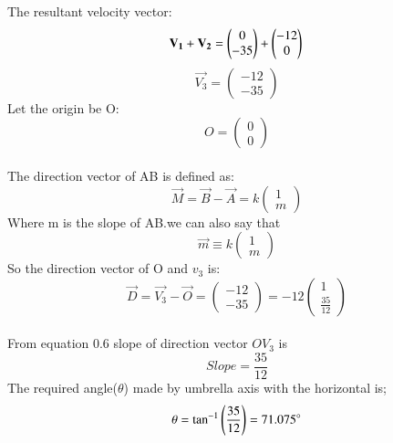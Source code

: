 \documentclass[journal]{IEEEtran}
\begin{document}
The resultant velocity vector:\\
\begin{equation}
\vec{V_{1}}+\vec{V_{2}}=\begin{pmatrix}
    0\\
    -35
\end{pmatrix}
+
\begin{pmatrix}
    -12\\
    0
\end{pmatrix}\\
\end{equation}
\begin{equation}
    \vec{V_{3}}=\begin{pmatrix}
        -12\\
        -35
    \end{pmatrix}
\end{equation}
Let the origin be O:
\begin{equation}
    O=\begin{pmatrix}
        0\\
        0
    \end{pmatrix}
\end{equation}\\


The direction vector of AB is defined as:
\begin{equation}
    \vec{M}=\vec{B}-\vec{A}=k\begin{pmatrix}
        1\\
        m
    \end{pmatrix}
    \tag{1.1.1.1}
\end{equation}
Where m is the slope of AB.we can also say that\\

\begin{equation}
    \vec{m}\equiv k\begin{pmatrix}
        1\\
        m
    \end{pmatrix}
    \tag{1.1.1.2}
\end{equation}
So the direction vector of O and $v_{3}$ is:
\begin{equation}
    \vec{D}=\vec{V_{3}}-\vec{O}=\begin{pmatrix}
        -12\\
        -35
    \end{pmatrix}
=-12\begin{pmatrix}
    1\\
    \frac{35}{12}
\end{pmatrix}
\end{equation}\\
From equation 0.6 slope of direction vector $OV_{3}$ is\\
\begin{equation}
    Slope=\frac{35}{12}
\end{equation}
The required angle($\theta$) made by umbrella axis with the horizontal is;\\
\begin{equation}
    \theta=\tan^{-1}\brak{\frac{35}{12}}=71.075^\circ
\end{equation}\\
\end{document}

